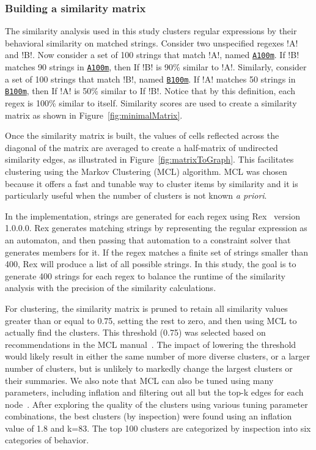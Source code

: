 \subsubsection{Building a similarity matrix}
\label{sec:buildingSimilarity}
The similarity analysis used in this study clusters regular expressions by their behavioral similarity on matched strings.  Consider two unspecified regexes \cverb!A! and \cverb!B!.
Now consider a set of 100 strings that match \cverb!A!, named \underline{\tt A100m}.  If \cverb!B! matches 90 strings in \underline{\tt A100m}, then If \cverb!B! is 90\% similar to \cverb!A!.  Similarly, consider a set of 100 strings that match \cverb!B!, named \underline{\tt B100m}.  If \cverb!A! matches 50 strings in \underline{\tt B100m}, then If \cverb!A! is 50\% similar to If \cverb!B!.  Notice that by this definition, each regex is 100\% similar to itself.  Similarity scores are used to create a similarity matrix as shown in Figure~\ref{fig:minimalMatrix}.

Once the similarity matrix is built, the values of cells reflected across the diagonal of the matrix are averaged to create a half-matrix of undirected similarity edges, as illustrated in Figure~\ref{fig:matrixToGraph}.
This facilitates clustering using the  Markov Clustering (MCL) algorithm.
MCL was chosen because it offers a fast and tunable way to cluster items by similarity and it is particularly useful when the number of clusters is not known \emph{a priori}.


In the implementation, strings are generated for each regex using Rex~ version {1.0.0.0}.  Rex generates matching strings by representing the regular expression as an automaton, and then passing that automation to a constraint solver that generates members for it.  If the regex matches a finite set of strings smaller than 400, Rex will produce a list of all possible strings.
In this study, the goal is to generate 400 strings for each regex to balance the runtime of the similarity analysis with the precision of the similarity calculations.

For clustering, the similarity matrix is pruned to retain all similarity values greater than or equal to 0.75, setting the rest to zero, and then using MCL to actually find the clusters.
This threshold (0.75) was selected based on recommendations in the MCL manual~. The impact of lowering the threshold would likely result  in either the same number of more diverse clusters, or a larger number of clusters, but is unlikely to markedly change the largest clusters or their summaries.
We also note that MCL can also be tuned using many parameters, including inflation and filtering out all but the top-k edges for each node~.
After exploring the quality of the clusters using various tuning parameter combinations, the best clusters (by inspection) were found using an inflation value of 1.8 and k=83.   The top 100 clusters are categorized by inspection into six categories of behavior.


